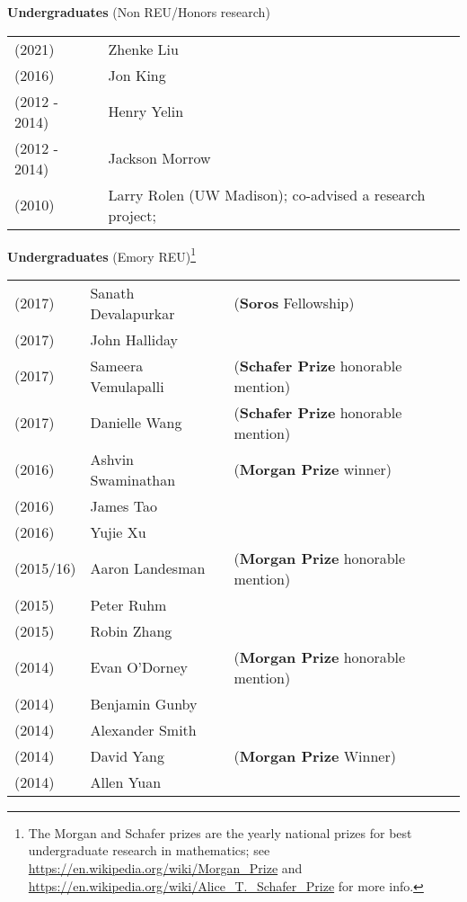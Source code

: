 \documentclass[margin,line]{res}
\newcommand{\defi}[1]{\textsf{#1}} 				%
\begin{document}
\begin{resume}
{\bf Undergraduates} (Non REU/Honors research)
\vspace*{-.15in}

\begin{tabular}{ll}
 (2021) & \defi{Zhenke Liu} \\
 (2016) & \defi{Jon King} \\  
 (2012 - 2014) & \defi{Henry Yelin} \\
 (2012 - 2014) & \defi{Jackson Morrow} \\
 (2010) &  \defi{Larry Rolen} (UW Madison); co-advised a research project; \\
\end{tabular}


{\bf Undergraduates} (Emory REU)\footnote{The Morgan and Schafer prizes are the yearly national prizes for best undergraduate research in mathematics; see \url{https://en.wikipedia.org/wiki/Morgan_Prize} and \url{https://en.wikipedia.org/wiki/Alice_T._Schafer_Prize} for more info.}
\vspace*{-.15in}

\begin{tabular}{lll}

(2017) & Sanath Devalapurkar  & (\textbf{Soros} Fellowship) \\
(2017) & John Halliday & \\
(2017) &  Sameera Vemulapalli & (\textbf{Schafer Prize} honorable mention)  \\
(2017) & Danielle Wang & (\textbf{Schafer Prize} honorable mention)  \\

(2016) & Ashvin Swaminathan & (\textbf{Morgan Prize} winner)  \\
(2016) & James Tao & \\
(2016) & Yujie Xu & \\

(2015/16) & Aaron Landesman & (\textbf{Morgan Prize} honorable mention)      \\
(2015) & Peter Ruhm & \\
(2015) & Robin Zhang & \\

(2014) & Evan O'Dorney    & (\textbf{Morgan Prize} honorable mention) \\
(2014) & Benjamin Gunby & \\
(2014) & Alexander Smith & \\
(2014) & David Yang & (\textbf{Morgan Prize} Winner)  \\
(2014) & Allen Yuan & \\


\end{tabular}
\end{resume}
\end{document}
